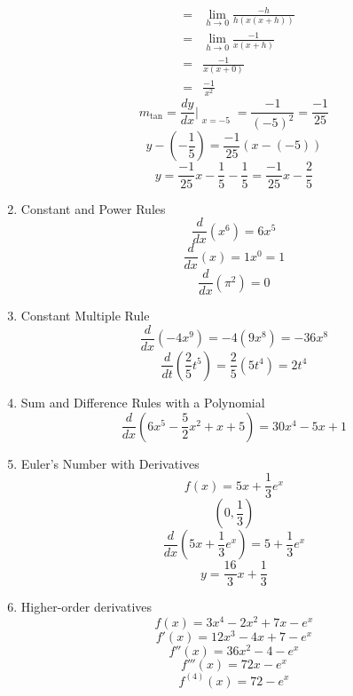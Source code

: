 \documentclass{article}
\begin{document}
\begin{enumerate}
\begin{eqnarray}
                      &=& \lim_{h \to 0}{\frac{-h}{h(x(x + h))}} \\
                      &=& \lim_{h \to 0}{\frac{-1}{x(x + h)}} \\
                      &=& \frac{-1}{x(x + 0)} \\
                      &=& \frac{-1}{x^2}
    \end{eqnarray}
    $$m_{\tan} = \frac{dy}{dx}\Bigr|_{\substack{x=-5}} = \frac{-1}{(-5)^2} = \frac{-1}{25}$$
    $$y - (- \frac{1}{5}) = \frac{-1}{25}(x - (-5))$$
    $$y = \frac{-1}{25}x - \frac{1}{5} - \frac{1}{5} = \frac{-1}{25}x - \frac{2}{5}$$
    \item Constant and Power Rules
    $$\frac{d}{dx}\left(x^6\right) = 6x^5$$
    $$\frac{d}{dx}\left(x\right) = 1x^0 = 1$$
    $$\frac{d}{dx}\left(\pi^2\right) = 0$$
    \item Constant Multiple Rule
    $$\frac{d}{dx}\left(-4x^9\right) = -4\left(9x^8\right) = -36x^8$$
    $$\frac{d}{dt}\left(\frac{2}{5}t^5\right) = \frac{2}{5}\left(5t^4\right) = 2t^4$$
    \item Sum and Difference Rules with a Polynomial
    $$\frac{d}{dx}\left(6x^5 - \frac{5}{2}x^2 + x + 5\right) = 30x^4 - 5x + 1$$
    \item Euler's Number with Derivatives
    $$f(x) = 5x + \frac{1}{3}e^x$$
    $$\left(0, \frac{1}{3}\right)$$
    $$\frac{d}{dx}\left(5x + \frac{1}{3}e^x\right) = 5 + \frac{1}{3}e^x$$
    $$y = \frac{16}{3}x + \frac{1}{3}$$
    \item Higher-order derivatives
    $$f(x) = 3x^4 - 2x^2 + 7x - e^x$$
    $$f'(x) = 12x^3 - 4x + 7 - e^x$$
    $$f''(x) = 36x^2 - 4 - e^x$$
    $$f'''(x) = 72x - e^x$$
    $$f^{(4)}(x) = 72 - e^x$$
\end{enumerate}
\end{document}
